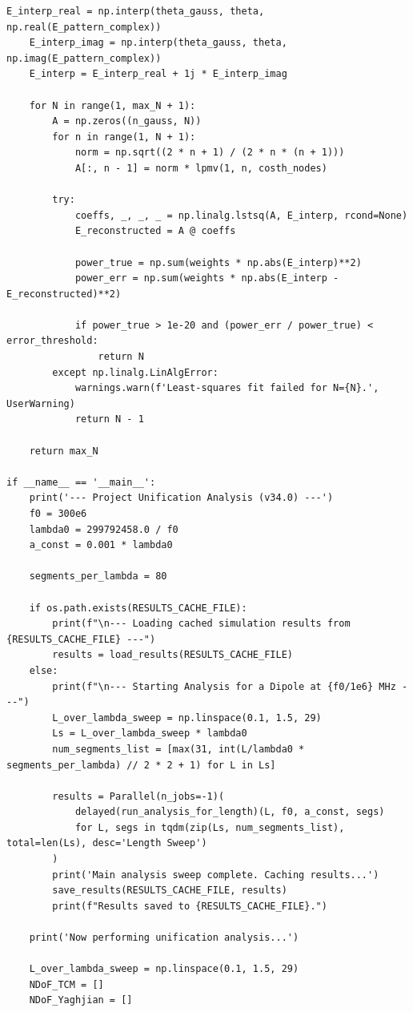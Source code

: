 \documentclass[11pt, a4paper]{report}
\begin{document}
\begin{lstlisting}[caption={Driver script for the Unification Analysis.}, label={lst:run_unification}]
    E_interp_real = np.interp(theta_gauss, theta, np.real(E_pattern_complex))
    E_interp_imag = np.interp(theta_gauss, theta, np.imag(E_pattern_complex))
    E_interp = E_interp_real + 1j * E_interp_imag

    for N in range(1, max_N + 1):
        A = np.zeros((n_gauss, N))
        for n in range(1, N + 1):
            norm = np.sqrt((2 * n + 1) / (2 * n * (n + 1)))
            A[:, n - 1] = norm * lpmv(1, n, costh_nodes)

        try:
            coeffs, _, _, _ = np.linalg.lstsq(A, E_interp, rcond=None)
            E_reconstructed = A @ coeffs
            
            power_true = np.sum(weights * np.abs(E_interp)**2)
            power_err = np.sum(weights * np.abs(E_interp - E_reconstructed)**2)
            
            if power_true > 1e-20 and (power_err / power_true) < error_threshold:
                return N
        except np.linalg.LinAlgError:
            warnings.warn(f'Least-squares fit failed for N={N}.', UserWarning)
            return N - 1
            
    return max_N

if __name__ == '__main__':
    print('--- Project Unification Analysis (v34.0) ---')
    f0 = 300e6
    lambda0 = 299792458.0 / f0
    a_const = 0.001 * lambda0
    
    segments_per_lambda = 80
    
    if os.path.exists(RESULTS_CACHE_FILE):
        print(f"\n--- Loading cached simulation results from {RESULTS_CACHE_FILE} ---")
        results = load_results(RESULTS_CACHE_FILE)
    else:
        print(f"\n--- Starting Analysis for a Dipole at {f0/1e6} MHz ---")
        L_over_lambda_sweep = np.linspace(0.1, 1.5, 29) 
        Ls = L_over_lambda_sweep * lambda0
        num_segments_list = [max(31, int(L/lambda0 * segments_per_lambda) // 2 * 2 + 1) for L in Ls]

        results = Parallel(n_jobs=-1)(
            delayed(run_analysis_for_length)(L, f0, a_const, segs)
            for L, segs in tqdm(zip(Ls, num_segments_list), total=len(Ls), desc='Length Sweep')
        )
        print('Main analysis sweep complete. Caching results...')
        save_results(RESULTS_CACHE_FILE, results)
        print(f"Results saved to {RESULTS_CACHE_FILE}.")

    print('Now performing unification analysis...')
    
    L_over_lambda_sweep = np.linspace(0.1, 1.5, 29)
    NDoF_TCM = []
    NDoF_Yaghjian = []


\end{lstlisting}
\end{document}
